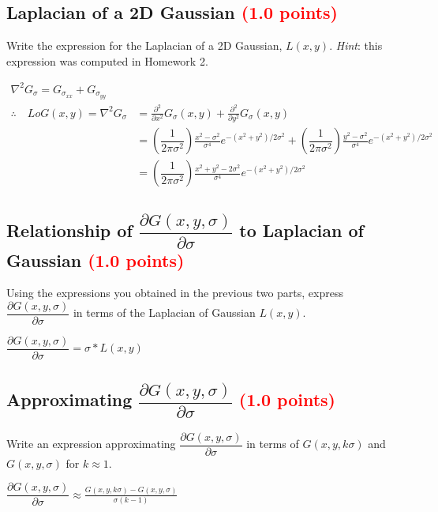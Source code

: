 \documentclass[answers]{exam}
\newcommand{\mypoints}[1]{\textcolor{red}{(#1 points)}}
\begin{document}
\subsection{Laplacian of a 2D Gaussian \mypoints{1.0}}
Write the expression for the Laplacian of a 2D Gaussian, $L(x, y)$. \emph{Hint}: this expression was computed in Homework 2.

\begin{solution}
$$
\begin{aligned}
    \nabla^{2} G_{\sigma}=G_{\sigma_{xx}}+G_{\sigma_{yy}}\\
    \therefore \quad LoG(x, y)=\nabla^{2} G_{\sigma}&=\frac{\partial^{2}}{\partial x^{2}} G_{\sigma}(x, y)+\frac{\partial^{2}}{\partial y^{2}} G_{\sigma}(x, y) \\
    &=(\dfrac{1}{2\pi \sigma^2})\frac{x^{2}-\sigma^{2}}{\sigma^{4}} e^{-\left(x^{2}+y^{2}\right) / 2 \sigma^{2}}+(\dfrac{1}{2\pi \sigma^2})\frac{y^{2}-\sigma^{2}}{\sigma^{4}} e^{-\left(x^{2}+y^{2}\right) / 2 \sigma^{2}} \\
    &=(\dfrac{1}{2\pi \sigma^2})\frac{x^{2}+y^{2}-2 \sigma^{2}}{\sigma^{4}} e^{-\left(x^{2}+y^{2}\right) / 2 \sigma^{2}}
\end{aligned}
$$
\end{solution}

\subsection{Relationship of $\dfrac{\partial G(x,y,\sigma)}{\partial \sigma}$ to Laplacian of Gaussian \mypoints{1.0}}
Using the expressions you obtained in the previous two parts, express $\dfrac{\partial G(x,y,\sigma)}{\partial \sigma}$ in terms of the Laplacian of Gaussian $L(x, y)$.
\begin{solution}
$
\dfrac{\partial G(x,y,\sigma)}{\partial \sigma}=\sigma * L(x, y)
$
\end{solution}

\subsection{Approximating $\dfrac{\partial G(x,y,\sigma)}{\partial \sigma}$ \mypoints{1.0}}
Write an expression approximating $\dfrac{\partial G(x,y,\sigma)}{\partial \sigma}$ in terms of $G(x,y,k\sigma)$ and $G(x,y,\sigma)$ for $k \approx 1$.
\begin{solution}

$\dfrac{\partial G(x,y,\sigma)}{\partial \sigma}\approx \frac{G(x,y,k\sigma)-G(x,y,\sigma)}{\sigma(k-1)}$

\end{solution}
\end{document}
